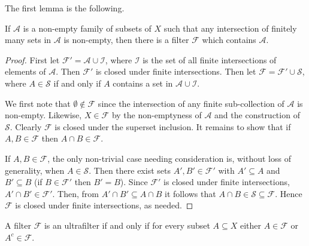 The first lemma is the following.
\begin{lemma}
\label{filter:1}
If \( \mathcal{A}  \) is a non-empty family of subsets of \( X \) such that any intersection of finitely many sets in \( \mathcal{A}   \) is non-empty, then there is a filter \( \mathcal{F}  \) which contains \( \mathcal{A} \).
\end{lemma}
\begin{proof}
First let \( \mathcal{F}' =  \mathcal{A} \cup \mathcal{I} \), where \( \mathcal{I} \) is the set of all finite intersections of elements of \( \mathcal{A}   \). Then \( \mathcal{F'}  \) is closed under finite intersections. Then let \( \mathcal{F} = \mathcal{F}' \cup \mathcal{S}  \), where \( A \in \mathcal{S}  \) if and only if \( A \) contains a set in \( \mathcal{A} \cup \mathcal{I}  \).

We first note that \( \emptyset \notin \mathcal{F} \) since the intersection of any finite sub-collection of \(\mathcal{A}   \) is non-empty. Likewise, \( X \in \mathcal{F}  \) by the non-emptyness of \( \mathcal{A}  \) and the construction of \( \mathcal{S}  \). Clearly \( \mathcal{F}  \) is closed under the superset inclusion. It remains to show that if \( A, B \in \mathcal{F}  \) then \( A \cap B \in \mathcal{F}  \). 

If \( A, B \in \mathcal{F}  \), the only non-trivial case needing consideration is, without loss of generality, when \( A \in \mathcal{S}  \). Then there exist sets \( A', B' \in \mathcal{F}' \) with \( A' \subseteq A \) and \( B' \subseteq B \) (if \( B \in \mathcal{F}' \) then \( B' = B \)). Since \( \mathcal{F} ' \) is closed under finite intersections, \( A' \cap B' \in \mathcal{F} ' \). Then, from \( A' \cap B' \subseteq A \cap B \) it follows that \( A \cap B \in \mathcal{S} \subseteq \mathcal{F}  \). Hence \( \mathcal{F}  \) is closed under finite intersections, as needed.
\end{proof}
\begin{lemma}
\label{filter:2}
A filter \( \mathcal{F}  \) is an ultrafilter if and only if for every subset \( A \subseteq X \) either \( A \in \mathcal{F}  \) or \( A^{c} \in \mathcal{F}  \).
\end{lemma}

